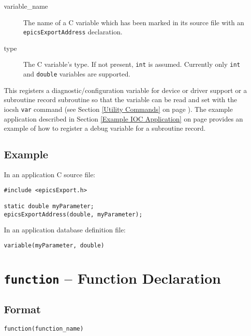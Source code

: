 \begin{description}
\item [variable\_name] The name of a C variable which has been marked in its source file with an 
\verb|epicsExportAddress| declaration.

\item [type] The C variable's type.
If not present, \verb|int| is assumed.
Currently only \verb|int| and \verb|double| variables are supported.
\end{description}

This registers a diagnostic/configuration variable for device or driver support or a subroutine record subroutine so that
the variable can be read and set with the iocsh \verb|var| command (see Section \ref{Utility Commands} on page \pageref{Utility Commands}).
The example application described in Section \ref{Example IOC Application} on page \pageref{Example IOC Application}
provides an example of how to register a debug variable for a subroutine record.

\subsection{Example}

In an application C source file:

\begin{verbatim}
#include <epicsExport.h>

static double myParameter;
epicsExportAddress(double, myParameter);
\end{verbatim}

In an application database definition file:

\begin{verbatim}
variable(myParameter, double)
\end{verbatim}

\section{\texttt{function} -- Function Declaration}

\subsection{Format}

\begin{verbatim}
function(function_name)
\end{verbatim}

